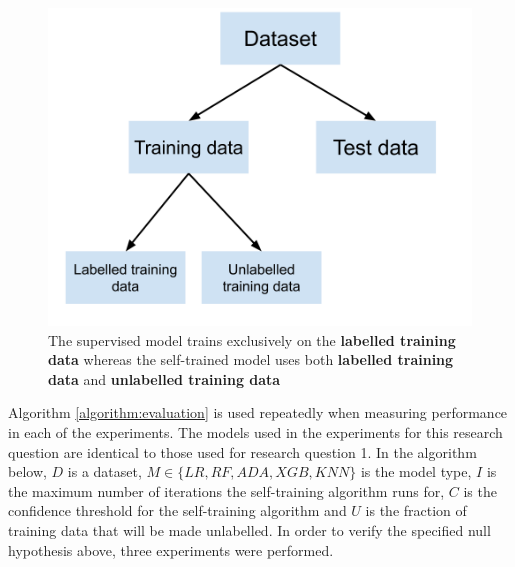 \documentclass[../main.tex]{subfiles}
\begin{document}
\begin{figure}[H]
    \centering
    \includegraphics[scale=0.4]{images/Methodology/data_split.png}
    \caption{The supervised model trains exclusively on the \textbf{labelled training data} whereas the self-trained model uses both \textbf{labelled training data} and \textbf{unlabelled training data}}
    \label{fig:train_test_labelled_split}
\end{figure}


Algorithm \ref{algorithm:evaluation} is used repeatedly when measuring performance in each of the experiments. The models used in the experiments for this research question are identical to those used for research question 1. In the algorithm below, $D$ is a dataset, $M \in \{LR, RF, ADA, XGB, KNN\}$ is the model type, $I$ is the maximum number of iterations the self-training algorithm runs for, $C$ is the confidence threshold for the self-training algorithm and $U$ is the fraction of training data that will be made unlabelled. In order to verify the specified null hypothesis above, three experiments were performed. 
\end{document}
